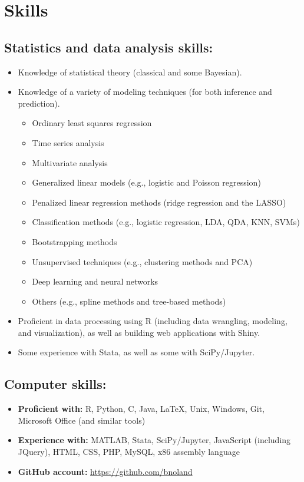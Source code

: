 \documentclass[letterpaper,12pt]{article}
\begin{document}
\section*{Skills}

\subsection*{Statistics and data analysis skills:}

\begin{itemize}
\item Knowledge of statistical theory (classical and some Bayesian).
\item Knowledge of a variety of modeling techniques (for both
  inference and prediction).
\begin{itemize}
\item Ordinary least squares regression
\item Time series analysis
\item Multivariate analysis
\item Generalized linear models (e.g., logistic and Poisson
  regression)
\item Penalized linear regression methods (ridge regression and the
  LASSO)
\item Classification methods (e.g., logistic regression, LDA, QDA,
  KNN, SVMs)
\item Bootstrapping methods
\item Unsupervised techniques (e.g., clustering methods and PCA)
\item Deep learning and neural networks
\item Others (e.g., spline methods and tree-based methods)
\end{itemize}
\item Proficient in data processing using R (including data wrangling,
  modeling, and visualization), as well as building web applications
  with Shiny.
\item Some experience with Stata, as well as some with SciPy/Jupyter.
\end{itemize}

\subsection*{Computer skills:}

\begin{itemize}
\item \textbf{Proficient with:} R, Python, C, Java, \LaTeX, Unix,
  Windows, Git, Microsoft Office (and similar tools)
\item \textbf{Experience with:} MATLAB, Stata, SciPy/Jupyter,
  JavaScript (including JQuery), HTML, CSS, PHP, MySQL, x86 assembly
  language
\item \textbf{GitHub account:} \url{https://github.com/bnoland}
\end{itemize}
\end{document}
